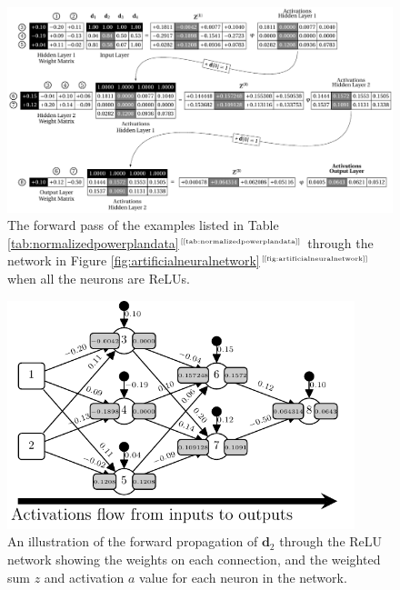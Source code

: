 \documentclass[xcolor={table}]{beamer}
\newcommand{\ourRef}[1]{\ref{#1}$^{\text{\tiny[\pageref{#1}]}}$}
\begin{document}
 \begin{frame} 
\begin{figure}
\includegraphics[width=\textwidth]{./images/fmlpda_8_18.pdf}
\caption{The forward pass of the examples listed in Table \ourRef{tab:normalizedpowerplandata} through the network in Figure \ourRef{fig:artificialneuralnetwork} when all the neurons are ReLUs.}
\label{fig:forwardpassrelus}
\end{figure}
\end{frame} 



 \begin{frame} 
\begin{figure}[!t]
\centerline{
\includegraphics[width=0.9\textwidth]{./images/fmlpda_8_19.pdf}
}
\caption{An illustration of the forward propagation of $\mathbf{d}_2$ through the ReLU network showing the weights on each connection, and the weighted sum $z$ and activation $a$ value for each neuron in the network.}
\label{fig:forwardpropex2relu}
\end{figure}
\end{frame} 
\end{document}
